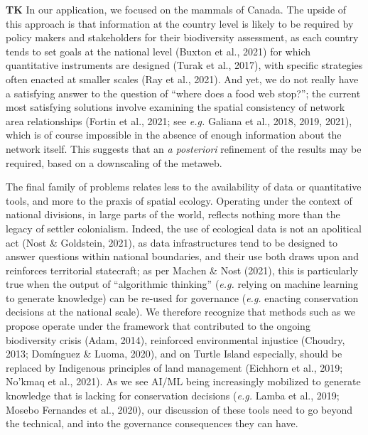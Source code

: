 \documentclass[10pt,oneside]{article}
\begin{document}
\textbf{TK} In our application, we focused on the mammals of Canada. The
upside of this approach is that information at the country level is
likely to be required by policy makers and stakeholders for their
biodiversity assessment, as each country tends to set goals at the
national level (Buxton et al., 2021) for which quantitative instruments
are designed (Turak et al., 2017), with specific strategies often
enacted at smaller scales (Ray et al., 2021). And yet, we do not really
have a satisfying answer to the question of ``where does a food web
stop?''; the current most satisfying solutions involve examining the
spatial consistency of network area relationships (Fortin et al., 2021;
see \emph{e.g.} Galiana et al., 2018, 2019, 2021), which is of course
impossible in the absence of enough information about the network
itself. This suggests that an \emph{a posteriori} refinement of the
results may be required, based on a downscaling of the metaweb.

The final family of problems relates less to the availability of data or
quantitative tools, and more to the praxis of spatial ecology. Operating
under the context of national divisions, in large parts of the world,
reflects nothing more than the legacy of settler colonialism. Indeed,
the use of ecological data is not an apolitical act (Nost \& Goldstein,
2021), as data infrastructures tend to be designed to answer questions
within national boundaries, and their use both draws upon and reinforces
territorial statecraft; as per Machen \& Nost (2021), this is
particularly true when the output of ``algorithmic thinking''
(\emph{e.g.} relying on machine learning to generate knowledge) can be
re-used for governance (\emph{e.g.} enacting conservation decisions at
the national scale). We therefore recognize that methods such as we
propose operate under the framework that contributed to the ongoing
biodiversity crisis (Adam, 2014), reinforced environmental injustice
(Choudry, 2013; Domínguez \& Luoma, 2020), and on Turtle Island
especially, should be replaced by Indigenous principles of land
management (Eichhorn et al., 2019; No'kmaq et al., 2021). As we see
AI/ML being increasingly mobilized to generate knowledge that is lacking
for conservation decisions (\emph{e.g.} Lamba et al., 2019; Mosebo
Fernandes et al., 2020), our discussion of these tools need to go beyond
the technical, and into the governance consequences they can have.
\end{document}
